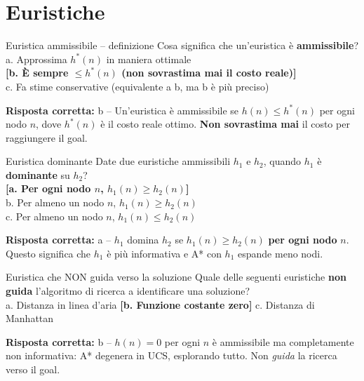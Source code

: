 \documentclass[12pt,a4paper]{article}
\newcommand{\corr}[1]{\textcolor{green!55!black}{\textbf{[#1]}}}
\newcommand{\risp}[1]{\begin{abox}\textbf{Risposta corretta: }#1\end{abox}}
\begin{document}
\section{Euristiche}

\begin{qbox}{Euristica ammissibile -- definizione}
Cosa significa che un'euristica è \textbf{ammissibile}?\\[4pt]
a. Approssima $h^*(n)$ in maniera ottimale\\
\corr{b. È sempre $\leq h^*(n)$ (non sovrastima mai il costo reale)}\\
c. Fa stime conservative (equivalente a b, ma b è più preciso)
\end{qbox}
\risp{b -- Un'euristica è ammissibile se $h(n) \leq h^*(n)$ per ogni nodo $n$, dove $h^*(n)$ è il costo reale ottimo. \textbf{Non sovrastima mai} il costo per raggiungere il goal.}

\bigskip
\begin{qbox}{Euristica dominante}
Date due euristiche ammissibili $h_1$ e $h_2$, quando $h_1$ è \textbf{dominante} su $h_2$?\\[4pt]
\corr{a. Per ogni nodo $n$, $h_1(n) \geq h_2(n)$}\\
b. Per almeno un nodo $n$, $h_1(n) \geq h_2(n)$\\
c. Per almeno un nodo $n$, $h_1(n) \leq h_2(n)$
\end{qbox}
\risp{a -- $h_1$ domina $h_2$ se $h_1(n) \geq h_2(n)$ \textbf{per ogni nodo} $n$. Questo significa che $h_1$ è più informativa e A* con $h_1$ espande meno nodi.}

\bigskip
\begin{qbox}{Euristica che NON guida verso la soluzione}
Quale delle seguenti euristiche \textbf{non guida} l'algoritmo di ricerca a identificare una soluzione?\\[4pt]
a. Distanza in linea d'aria \quad
\corr{b. Funzione costante zero} \quad
c. Distanza di Manhattan
\end{qbox}
\risp{b -- $h(n) = 0$ per ogni $n$ è ammissibile ma completamente non informativa: A* degenera in UCS, esplorando tutto. Non \emph{guida} la ricerca verso il goal.}
\end{document}
